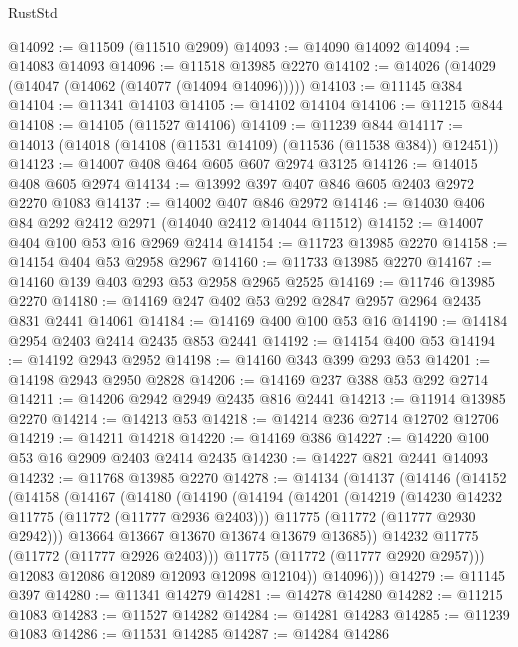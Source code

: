 \begin{lexlean}{RustStd}
\begin{coremodule}
@14092 := @11509 (@11510 @2909)
@14093 := @14090 @14092
@14094 := @14083 @14093
@14096 := @11518 @13985 @2270
@14102 := @14026 (@14029 (@14047 (@14062 (@14077 (@14094 @14096)))))
@14103 := @11145 @384
@14104 := @11341 @14103
@14105 := @14102 @14104
@14106 := @11215 @844
@14108 := @14105 (@11527 @14106)
@14109 := @11239 @844
@14117 := @14013 (@14018 (@14108 (@11531 @14109) (@11536 (@11538 @384)) @12451))
@14123 := @14007 @408 @464 @605 @607 @2974 @3125
@14126 := @14015 @408 @605 @2974
@14134 := @13992 @397 @407 @846 @605 @2403 @2972 @2270 @1083
@14137 := @14002 @407 @846 @2972
@14146 := @14030 @406 @84 @292 @2412 @2971 (@14040 @2412 @14044 @11512)
@14152 := @14007 @404 @100 @53 @16 @2969 @2414
@14154 := @11723 @13985 @2270
@14158 := @14154 @404 @53 @2958 @2967
@14160 := @11733 @13985 @2270
@14167 := @14160 @139 @403 @293 @53 @2958 @2965 @2525
@14169 := @11746 @13985 @2270
@14180 := @14169 @247 @402 @53 @292 @2847 @2957 @2964 @2435 @831 @2441 @14061
@14184 := @14169 @400 @100 @53 @16
@14190 := @14184 @2954 @2403 @2414 @2435 @853 @2441
@14192 := @14154 @400 @53
@14194 := @14192 @2943 @2952
@14198 := @14160 @343 @399 @293 @53
@14201 := @14198 @2943 @2950 @2828
@14206 := @14169 @237 @388 @53 @292 @2714
@14211 := @14206 @2942 @2949 @2435 @816 @2441
@14213 := @11914 @13985 @2270
@14214 := @14213 @53
@14218 := @14214 @236 @2714 @12702 @12706
@14219 := @14211 @14218
@14220 := @14169 @386
@14227 := @14220 @100 @53 @16 @2909 @2403 @2414 @2435
@14230 := @14227 @821 @2441 @14093
@14232 := @11768 @13985 @2270
@14278 := @14134
    (@14137
      (@14146
        (@14152
          (@14158
            (@14167
              (@14180
                (@14190
                  (@14194
                    (@14201
                      (@14219
                        (@14230 @14232 @11775 (@11772 (@11777 @2936 @2403)))
                        @11775
                        (@11772 (@11777 @2930 @2942)))
                      @13664
                      @13667
                      @13670
                      @13674
                      @13679
                      @13685))
                  @14232
                  @11775
                  (@11772 (@11777 @2926 @2403)))
                @11775
                (@11772 (@11777 @2920 @2957)))
              @12083
              @12086
              @12089
              @12093
              @12098
              @12104))
          @14096)))
@14279 := @11145 @397
@14280 := @11341 @14279
@14281 := @14278 @14280
@14282 := @11215 @1083
@14283 := @11527 @14282
@14284 := @14281 @14283
@14285 := @11239 @1083
@14286 := @11531 @14285
@14287 := @14284 @14286

\end{coremodule}
\end{lexlean}
